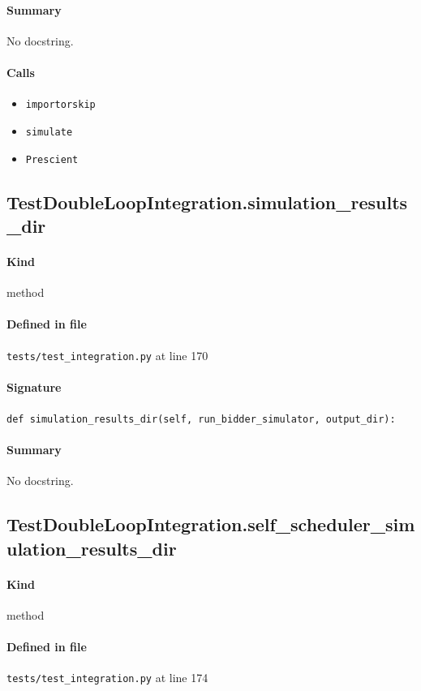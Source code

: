 \documentclass[11pt]{report}
\begin{document}
\paragraph{Summary} No docstring.
\paragraph{Calls}
\begin{itemize}[leftmargin=*]
  \item \texttt{importorskip}
  \item \texttt{simulate}
  \item \texttt{Prescient}
\end{itemize}
\subsection{TestDoubleLoopIntegration.simulation\_results\_dir}
\label{def:tests-test_integration.py:TestDoubleLoopIntegration.simulation_results_dir:L170}
\paragraph{Kind} method
\paragraph{Defined in file} \texttt{tests/test\_integration.py} at line 170
\paragraph{Signature} \texttt{def simulation\_results\_dir(self, run\_bidder\_simulator, output\_dir):}
\paragraph{Summary} No docstring.
\subsection{TestDoubleLoopIntegration.self\_scheduler\_simulation\_results\_dir}
\label{def:tests-test_integration.py:TestDoubleLoopIntegration.self_scheduler_simulation_results_dir:L174}
\paragraph{Kind} method
\paragraph{Defined in file} \texttt{tests/test\_integration.py} at line 174
\end{document}

